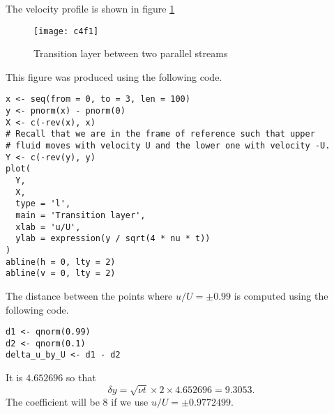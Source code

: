 \begin{itemize}
\begin{equation}
\end{equation}
The velocity profile is shown in figure \ref{c4f1}
\begin{figure}
\centering
\texttt{[image: c4f1]}
\caption{Transition layer between two parallel streams}\label{c4f1}
\end{figure}
This figure was produced using the following code.
\begin{verbatim}
x <- seq(from = 0, to = 3, len = 100)
y <- pnorm(x) - pnorm(0)
X <- c(-rev(x), x)
# Recall that we are in the frame of reference such that upper 
# fluid moves with velocity U and the lower one with velocity -U.
Y <- c(-rev(y), y)
plot(
  Y,
  X,
  type = 'l',
  main = 'Transition layer',
  xlab = 'u/U',
  ylab = expression(y / sqrt(4 * nu * t))
)
abline(h = 0, lty = 2)
abline(v = 0, lty = 2)
\end{verbatim}

The distance between the points where $u/U = \pm 0.99$ is computed using the following code.
\begin{verbatim}
d1 <- qnorm(0.99)
d2 <- qnorm(0.1)
delta_u_by_U <- d1 - d2
\end{verbatim}
It is $4.652696$ so that 
\[
\delta y = \sqrt{\nu t} \times 2 \times 4.652696 = 9.3053.
\]
The coefficient will be $8$ if we use $u/U = \pm 0.9772499$.


\end{itemize}
